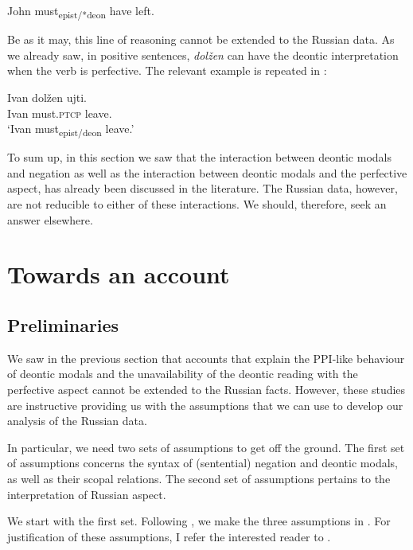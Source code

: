 \documentclass[output=paper,
modfonts,
newtxmath,colorlinks,citecolor=brown
]{langscibook}
\begin{document}
	\ea John must\textsubscript{epist/*deon} have left.\label{deonasp}
    \z 
    \ea \label{deonfut}  
	\z \z 

\noindent Be as it may, this line of reasoning cannot be extended to the Russian data. As we already saw, in positive sentences, \textit{dolžen} can have the deontic interpretation when the verb is perfective. The relevant example is repeated in :
 
\ea \gll Ivan dolžen ujti.\\
		Ivan must.\textsc{ptcp} {leave.\p} \\
        \glt `Ivan must\textsubscript{epist/deon} leave.' \label{deonasprus}
        \z 

\noindent To sum up, in this section we saw that the interaction between deontic modals and negation as well as the interaction between deontic modals and the perfective aspect, has already been discussed in the literature. The Russian data, however,  are not reducible to either of these interactions. We should, therefore, seek an answer elsewhere.
 
\section{Towards an account}\label{sect:proposal} 
\subsection{Preliminaries}\label{subsect:prelim} 
We saw in the previous section that accounts that explain the PPI-like behaviour of deontic modals and the unavailability of the deontic reading with the perfective aspect cannot be extended to the Russian facts. However, these studies are instructive providing us with the assumptions that we can use to develop our analysis of the Russian data.

In particular, we  need two sets of assumptions to get off the ground. The first set of assumptions concerns the syntax of (sentential) negation and deontic modals, as well as their scopal relations. The second set of assumptions pertains to the interpretation of Russian aspect. 

We start with the first set. Following \cite{iatzei10,iatzei13}, we make the three assumptions in . For justification of these assumptions, I refer the interested reader to \cite{iatzei10,iatzei13}.
\end{document}
